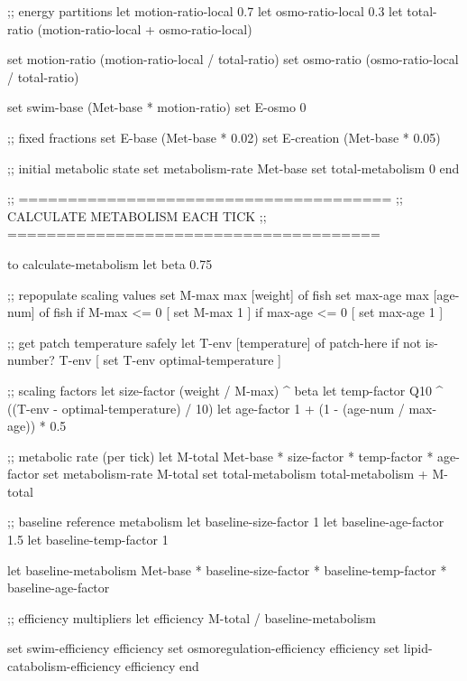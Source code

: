 \documentclass[
]{book}
\newenvironment{Shaded}{\begin{snugshade}}{\end{snugshade}}
\newcommand{\NormalTok}[1]{#1}
\begin{document}
\begin{Shaded}
\begin{Highlighting}[]
\NormalTok{  ;; energy partitions}
\NormalTok{  let motion{-}ratio{-}local 0.7}
\NormalTok{  let osmo{-}ratio{-}local   0.3}
\NormalTok{  let total{-}ratio (motion{-}ratio{-}local + osmo{-}ratio{-}local)}

\NormalTok{  set motion{-}ratio (motion{-}ratio{-}local / total{-}ratio)}
\NormalTok{  set osmo{-}ratio   (osmo{-}ratio{-}local / total{-}ratio)}

\NormalTok{  set swim{-}base (Met{-}base * motion{-}ratio)}
\NormalTok{  set E{-}osmo 0}

\NormalTok{  ;; fixed fractions}
\NormalTok{  set E{-}base     (Met{-}base * 0.02)}
\NormalTok{  set E{-}creation (Met{-}base * 0.05)}

\NormalTok{  ;; initial metabolic state}
\NormalTok{  set metabolism{-}rate Met{-}base}
\NormalTok{  set total{-}metabolism 0}
\NormalTok{end}


\NormalTok{;; ======================================}
\NormalTok{;;        CALCULATE METABOLISM EACH TICK}
\NormalTok{;; ======================================}

\NormalTok{to calculate{-}metabolism}
\NormalTok{  let beta 0.75}

\NormalTok{  ;; repopulate scaling values}
\NormalTok{  set M{-}max max [weight] of fish}
\NormalTok{  set max{-}age max [age{-}num] of fish}
\NormalTok{  if M{-}max \textless{}= 0 [ set M{-}max 1 ]}
\NormalTok{  if max{-}age \textless{}= 0 [ set max{-}age 1 ]}

\NormalTok{  ;; get patch temperature safely}
\NormalTok{  let T{-}env [temperature] of patch{-}here}
\NormalTok{  if not is{-}number? T{-}env [ set T{-}env optimal{-}temperature ]}

\NormalTok{  ;; scaling factors}
\NormalTok{  let size{-}factor (weight / M{-}max) \^{} beta}
\NormalTok{  let temp{-}factor Q10 \^{} ((T{-}env {-} optimal{-}temperature) / 10)}
\NormalTok{  let age{-}factor 1 + (1 {-} (age{-}num / max{-}age)) * 0.5}

\NormalTok{  ;; metabolic rate (per tick)}
\NormalTok{  let M{-}total Met{-}base * size{-}factor * temp{-}factor * age{-}factor}
\NormalTok{  set metabolism{-}rate M{-}total}
\NormalTok{  set total{-}metabolism total{-}metabolism + M{-}total}

\NormalTok{  ;; baseline reference metabolism}
\NormalTok{  let baseline{-}size{-}factor 1}
\NormalTok{  let baseline{-}age{-}factor 1.5}
\NormalTok{  let baseline{-}temp{-}factor 1}

\NormalTok{  let baseline{-}metabolism Met{-}base *}
\NormalTok{      baseline{-}size{-}factor *}
\NormalTok{      baseline{-}temp{-}factor *}
\NormalTok{      baseline{-}age{-}factor}

\NormalTok{  ;; efficiency multipliers}
\NormalTok{  let efficiency M{-}total / baseline{-}metabolism}

\NormalTok{  set swim{-}efficiency              efficiency}
\NormalTok{  set osmoregulation{-}efficiency    efficiency}
\NormalTok{  set lipid{-}catabolism{-}efficiency  efficiency}
\NormalTok{end}
\end{Highlighting}
\end{Shaded}
\end{document}
